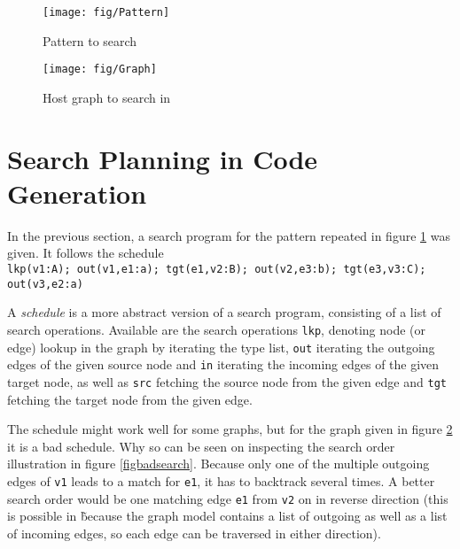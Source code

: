 \begin{figure}[htbp]
  \centering
  \texttt{[image: fig/Pattern]}
  \caption{Pattern to search}
  \label{figpatterntosearch}
\end{figure}

\begin{figure}[htbp]
  \centering
  \texttt{[image: fig/Graph]}
  \caption{Host graph to search in}
  \label{figgraphtosearchin}
\end{figure}


\section{Search Planning in Code Generation}
\label{searchplanning}

In the previous section, a search program for the pattern repeated in figure \ref{figpatterntosearch} was given.
It follows the schedule\\
\texttt{lkp(v1:A); out(v1,e1:a); tgt(e1,v2:B); out(v2,e3:b); tgt(e3,v3:C); out(v3,e2:a)}

A \emph{schedule} is a more abstract version of a search program, consisting of a list of search operations.
Available are the search operations \texttt{lkp}, denoting node (or edge) lookup in the graph by iterating the type list, 
\texttt{out} iterating the outgoing edges of the given source node and \texttt{in} iterating the incoming edges of the given target node,
as well as \texttt{src} fetching the source node from the given edge and \texttt{tgt} fetching the target node from the given edge.

The schedule might work well for some graphs, but for the graph given in figure \ref{figgraphtosearchin} it is a bad schedule.
Why so can be seen on inspecting the search order illustration in figure \ref{figbadsearch}.
Because only one of the multiple outgoing edges of \texttt{v1} leads to a match for \texttt{e1}, it has to backtrack several times.
A better search order would be one matching edge \texttt{e1} from \texttt{v2} on in reverse direction 
(this is possible in \GrG\~because the graph model contains a list of outgoing as well as a list of incoming edges, so each edge can be traversed in either direction).

